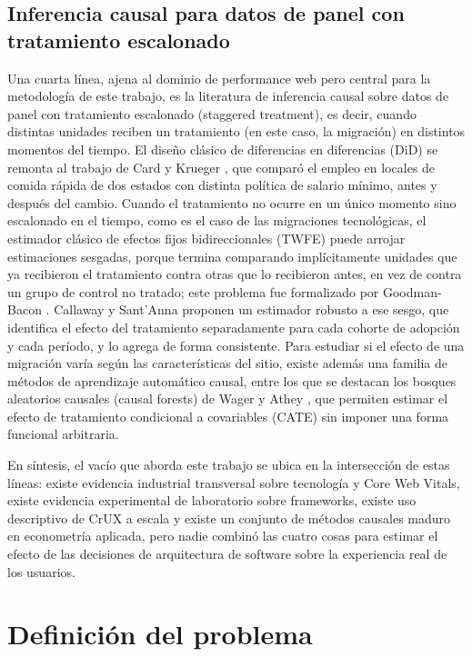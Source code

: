 \documentclass[12pt, a4paper]{article}
\begin{document}
\subsection{Inferencia causal para datos de panel con tratamiento escalonado}

Una cuarta línea, ajena al dominio de performance web pero central para la metodología de este trabajo, es la literatura de inferencia causal sobre datos de panel con tratamiento escalonado (staggered treatment), es decir, cuando distintas unidades reciben un tratamiento (en este caso, la migración) en distintos momentos del tiempo. El diseño clásico de diferencias en diferencias (DiD) se remonta al trabajo de Card y Krueger \cite{cardkrueger1994}, que comparó el empleo en locales de comida rápida de dos estados con distinta política de salario mínimo, antes y después del cambio. Cuando el tratamiento no ocurre en un único momento sino escalonado en el tiempo, como es el caso de las migraciones tecnológicas, el estimador clásico de efectos fijos bidireccionales (TWFE) puede arrojar estimaciones sesgadas, porque termina comparando implícitamente unidades que ya recibieron el tratamiento contra otras que lo recibieron antes, en vez de contra un grupo de control no tratado; este problema fue formalizado por Goodman-Bacon \cite{goodmanbacon2021}. Callaway y Sant'Anna \cite{callawaysantanna2021} proponen un estimador robusto a ese sesgo, que identifica el efecto del tratamiento separadamente para cada cohorte de adopción y cada período, y lo agrega de forma consistente. Para estudiar si el efecto de una migración varía según las características del sitio, existe además una familia de métodos de aprendizaje automático causal, entre los que se destacan los bosques aleatorios causales (causal forests) de Wager y Athey \cite{wagerathey2018}, que permiten estimar el efecto de tratamiento condicional a covariables (CATE) sin imponer una forma funcional arbitraria.

En síntesis, el vacío que aborda este trabajo se ubica en la intersección de estas líneas: existe evidencia industrial transversal sobre tecnología y Core Web Vitals, existe evidencia experimental de laboratorio sobre frameworks, existe uso descriptivo de CrUX a escala y existe un conjunto de métodos causales maduro en econometría aplicada, pero nadie combinó las cuatro cosas para estimar el efecto de las decisiones de arquitectura de software sobre la experiencia real de los usuarios.

\section{Definición del problema}
\end{document}
